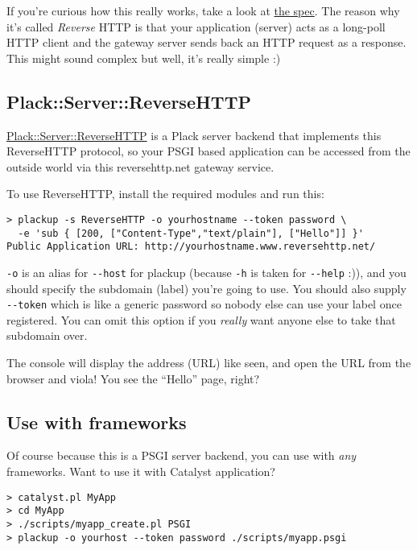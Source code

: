 If you're curious how this really works, take a look at
\href{http://www.reversehttp.net/specs.html}{the spec}. The reason why
it's called \emph{Reverse} HTTP is that your application (server) acts
as a long-poll HTTP client and the gateway server sends back an HTTP
request as a response. This might sound complex but well, it's really
simple :)

\subsection{Plack::Server::ReverseHTTP}\label{plackserverreversehttp}

\href{http://search.cpan.org/~miyagawa/Plack-Server-ReverseHTTP-0.01/}{Plack::Server::ReverseHTTP}
is a Plack server backend that implements this ReverseHTTP protocol, so
your PSGI based application can be accessed from the outside world via
this reversehttp.net gateway service.

To use ReverseHTTP, install the required modules and run this:

\begin{lstlisting}
> plackup -s ReverseHTTP -o yourhostname --token password \
  -e 'sub { [200, ["Content-Type","text/plain"], ["Hello"]] }'
Public Application URL: http://yourhostname.www.reversehttp.net/
\end{lstlisting}

\lstinline!-o! is an alias for \lstinline!--host! for plackup (because
\lstinline!-h! is taken for \lstinline!--help! :)), and you should
specify the subdomain (label) you're going to use. You should also
supply \lstinline!--token! which is like a generic password so nobody
else can use your label once registered. You can omit this option if you
\emph{really} want anyone else to take that subdomain over.

The console will display the address (URL) like seen, and open the URL
from the browser and viola! You see the ``Hello'' page, right?

\subsection{Use with frameworks}\label{use-with-frameworks}

Of course because this is a PSGI server backend, you can use with
\emph{any} frameworks. Want to use it with Catalyst application?

\begin{lstlisting}
> catalyst.pl MyApp
> cd MyApp
> ./scripts/myapp_create.pl PSGI
> plackup -o yourhost --token password ./scripts/myapp.psgi
\end{lstlisting}

